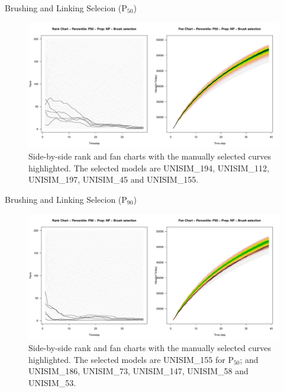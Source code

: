 \documentclass{beamer}
\begin{document}
\begin{frame}{Brushing and Linking Selecion (P$_{50}$)}
  \begin{figure}[H]
    \centering
    \includegraphics[width=\columnwidth]{rank-fan-brush-p50.pdf}
    \caption{Side-by-side rank and fan charts with the manually selected curves highlighted. The selected models are UNISIM\_194, UNISIM\_112, UNISIM\_197, UNISIM\_45 and UNISIM\_155.}
    \label{fig:rank-fan-brush-p50}
  \end{figure}
\end{frame}

\begin{frame}{Brushing and Linking Selecion (P$_{90}$)}
  \begin{figure}[H]
    \centering
    \includegraphics[width=\columnwidth]{rank-fan-brush-p90.pdf}
    \caption{Side-by-side rank and fan charts with the manually selected curves highlighted. The selected models are UNISIM\_155 for P$_{50}$; and UNISIM\_186, UNISIM\_73, UNISIM\_147, UNISIM\_58 and UNISIM\_53.}
    \label{fig:rank-fan-brush-p90}
  \end{figure}
\end{frame}
\end{document}
